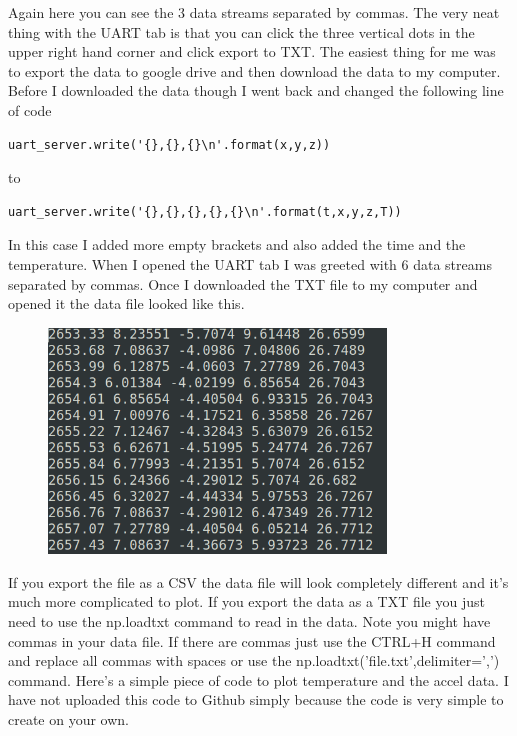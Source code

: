 Again here you can see the 3 data streams separated by commas. The
very neat thing with the UART tab is that you can click the three
vertical dots in the upper right hand corner and click export to
TXT. The easiest thing for me was to export the data to google drive
and then download the data to my computer. Before I downloaded the
data though I went back and changed the following line of code 
\begin{verbatim}
uart_server.write('{},{},{}\n'.format(x,y,z))
\end{verbatim}
to 
\begin{verbatim}
uart_server.write('{},{},{},{},{}\n'.format(t,x,y,z,T))
\end{verbatim}
In this case I added more empty brackets and also added the time and
the temperature. When I opened the UART tab I was greeted with 6 data
streams separated by commas. Once I downloaded the TXT file to my
computer and opened it the data file looked like this. 
\begin{figure}[H]
  \begin{center}
    \includegraphics[width=0.8\textwidth]{Figures/csv_fileapp.png}
  \end{center}
\end{figure}
If you export the file as a CSV the data file will look completely
different and it's much more complicated to plot. If you export the
data as a TXT file you just need to use the np.loadtxt command to read
in the data. Note you might have commas in your data file. If there
are commas just use the CTRL+H command and replace all commas with
spaces or use the np.loadtxt('file.txt',delimiter=',') command. Here's
a simple piece of code to plot temperature and the accel data. I have
not uploaded this code to Github simply because the code is very
simple to create on your own. 
